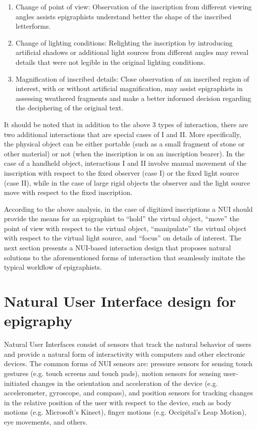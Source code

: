 \documentclass[amsthm,ebook]{saparticle}
\begin{document}
\begin{enumerate}
\item Change of point of view: Observation of the inscription from different viewing angles assists epigraphists
understand better the shape of the inscribed letterforms. 
\item Change of lighting conditions: Relighting the inscription by introducing artificial shadows or additional light
sources from different angles may reveal details that were not legible in the original lighting conditions.
\item Magnification of inscribed details: Close observation of an inscribed region of interest, with or without
artificial magnification, may assist epigraphists in assessing weathered fragments and make a better informed decision
regarding the deciphering of the original text.
\end{enumerate}
It should be noted that in addition to the above 3 types of interaction, there are two additional interactions that are
special cases of I and II. More specifically, the physical object can be either portable (such as a small fragment of
stone or other material) or not (when the inscription is on an inscription bearer). In the case of a handheld object,
interactions I and II involve manual movement of the inscription with respect to the fixed observer (case I) or the
fixed light source (case II), while in the case of large rigid objects the observer and the light source move with
respect to the fixed inscription. 

According to the above analysis, in the case of digitized inscriptions a NUI should provide the means for an epigraphist
to ``hold'' the virtual object, ``move'' the point of view with
respect to the virtual object, ``manipulate'' the virtual object with respect to the virtual
light source, and ``focus'' on details of interest. The next section presents a NUI-based
interaction design that proposes natural solutions to the aforementioned forms of interaction that seamlessly imitate
the typical workflow of epigraphists. 

\section{Natural User Interface design for epigraphy}


Natural User Interfaces consist of sensors that track the natural behavior of users and provide a natural form of
interactivity with computers and other electronic devices. The common forms of NUI sensors are: pressure sensors for
sensing touch gestures (e.g. touch screens and touch pads), motion sensors for sensing user-initiated changes in the
orientation and acceleration of the device (e.g. accelerometer, gyroscope, and compass), and position sensors for
tracking changes in the relative position of the user with respect to the device, such as body motions (e.g.
Microsoft's Kinect), finger motions (e.g. Occipital's Leap Motion), eye movements, and others.
\end{document}
